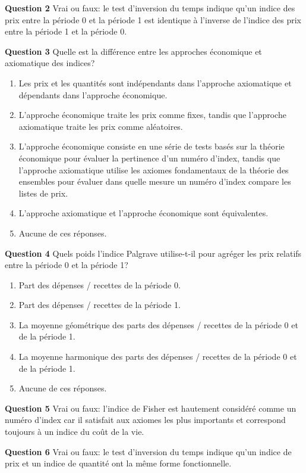 \documentclass[]{article}
\begin{document}
\textbf{Question 2} Vrai ou faux: le test d'inversion du temps indique qu'un indice des prix entre la période 0 et la période 1 est identique à l'inverse de l'indice des prix entre la période 1 et la période 0.

\textbf{Question 3} Quelle est la différence entre les approches économique et axiomatique des indices?

\begin{enumerate}
\def\labelenumi{\alph{enumi})}
\item
  Les prix et les quantités sont indépendants dans l'approche axiomatique et dépendants dans l'approche économique.
\item
  L'approche économique traite les prix comme fixes, tandis que l'approche axiomatique traite les prix comme aléatoires.
\item
  L'approche économique consiste en une série de tests basés sur la théorie économique pour évaluer la pertinence d'un numéro d'index, tandis que l'approche axiomatique utilise les axiomes fondamentaux de la théorie des ensembles pour évaluer dans quelle mesure un numéro d'index compare les listes de prix.
\item
  L'approche axiomatique et l'approche économique sont équivalentes.
\item
  Aucune de ces réponses.
\end{enumerate}

\textbf{Question 4} Quels poids l'indice Palgrave utilise-t-il pour agréger les prix relatifs entre la période 0 et la période 1?

\begin{enumerate}
\def\labelenumi{\alph{enumi})}
\item
  Part des dépenses / recettes de la période 0.
\item
  Part des dépenses / recettes de la période 1.
\item
  La moyenne géométrique des parts des dépenses / recettes de la période 0 et de la période 1.
\item
  La moyenne harmonique des parts des dépenses / recettes de la période 0 et de la période 1.
\item
  Aucune de ces réponses.
\end{enumerate}

\textbf{Question 5} Vrai ou faux: l'indice de Fisher est hautement considéré comme un numéro d'index car il satisfait aux axiomes les plus importants et correspond toujours à un indice du coût de la vie.

\textbf{Question 6} Vrai ou faux: le test d'inversion du temps indique qu'un indice de prix et un indice de quantité ont la même forme fonctionnelle.
\end{document}
